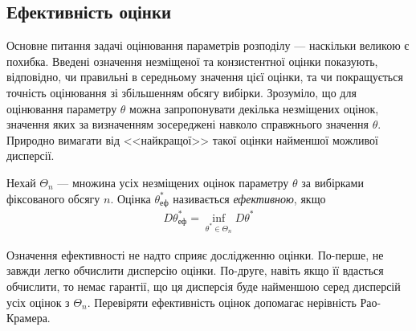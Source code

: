 \subsection{Ефективність оцінки}
Основне питання задачі оцінювання параметрів розподілу --- наскільки великою є похибка. 
Введені означення незміщеної та конзистентної оцінки показують, відповідно, чи правильні в середньому значення цієї оцінки,
та чи покращується точність оцінювання зі збільшенням обсягу вибірки.
Зрозуміло, що для оцінювання параметру $\theta$ можна запропонувати декілька незміщених оцінок, значення яких за визначенням
зосереджені навколо справжнього значення $\theta$. Природно вимагати від <<найкращої>> такої оцінки найменшої можливої дисперсії.
\begin{definition}
    Нехай $\Theta_n$ --- множина усіх незміщених оцінок параметру $\theta$ за вибірками фіксованого обсягу $n$. 
    Оцінка $\theta^*_{\text{еф}}$ називається
    \emph{ефективною}, якщо 
    \begin{gather}\label{estim_eff}
        D\theta^*_{\text{еф}} = \underset{\theta^* \in \Theta_n}{\inf} D\theta^*
    \end{gather}
\end{definition}
Означення ефективності не надто сприяє дослідженню оцінки. По-перше, не завжди
легко обчислити дисперсію оцінки. По-друге, навіть якщо її вдасться обчислити, то немає гарантії, що ця дисперсія буде найменшою серед дисперсій усіх оцінок
з $\Theta_n$. Перевіряти ефективність оцінок допомагає нерівність Рао-Крамера.

